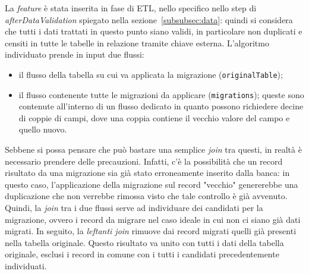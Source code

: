 La \textit{feature} è stata inserita in fase di ETL, nello specifico nello step di \textit{afterDataValidation} spiegato nella sezione~\ref{subsubsec:data}:
quindi si considera che tutti i dati trattati in questo punto siano validi, in particolare non duplicati e censiti in tutte le tabelle in relazione tramite chiave esterna.
L'algoritmo individuato prende in input due flussi:
\begin{itemize}
    \item il flusso della tabella su cui va applicata la migrazione (\texttt{originalTable});
    \item il flusso contenente tutte le migrazioni da applicare (\texttt{migrations});
    queste sono contenute all'interno di un flusso dedicato in quanto possono richiedere decine di coppie di campi, dove una coppia contiene il vecchio valore del campo e quello nuovo.
\end{itemize}
Sebbene si possa pensare che può bastare una semplice \textit{join} tra questi, in realtà è necessario prendere delle precauzioni.
Infatti, c'è la possibilità che un record risultato da una migrazione sia già stato erroneamente inserito dalla banca:
in questo caso, l'applicazione della migrazione sul record "vecchio" genererebbe una duplicazione che non verrebbe rimossa visto che tale controllo è già avvenuto.
Quindi, la \textit{join} tra i due flussi serve ad individuare dei candidati per la migrazione, ovvero i record da migrare nel caso ideale in cui non ci siano già dati migrati.
In seguito, la \textit{leftanti join} rimuove dai record migrati quelli già presenti nella tabella originale.
Questo risultato va unito con tutti i dati della tabella originale, esclusi i record in comune con i tutti i candidati precedentemente individuati.